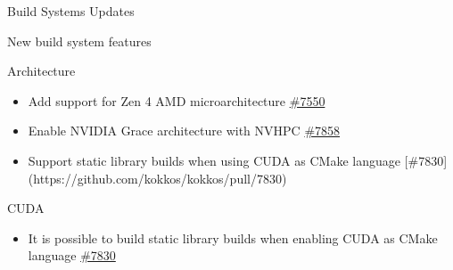 
\begin{frame}[fragile]

  {\Huge Build Systems Updates}

  \vspace{10pt}

\end{frame}




\begin{frame}[fragile]{New build system features}
  \begin{block}{Architecture}
  \begin{itemize}
      \item Add support for Zen 4 AMD microarchitecture \hyperlink{https://github.com/kokkos/kokkos/pull/7550}{\#7550}
      \item Enable NVIDIA Grace architecture with NVHPC \hyperlink{https://github.com/kokkos/kokkos/pull/7858}{\#7858}
      \item Support static library builds when using CUDA as CMake language [\#7830](https://github.com/kokkos/kokkos/pull/7830)
  \end{itemize}
  \end{block}

  \begin{block}{CUDA}
  \begin{itemize}
      \item It is possible to build static library builds when enabling CUDA as CMake language \hyperlink{https://github.com/kokkos/kokkos/pull/7830}{\#7830}
  \end{itemize}
  \end{block}
\end{frame}

%        




